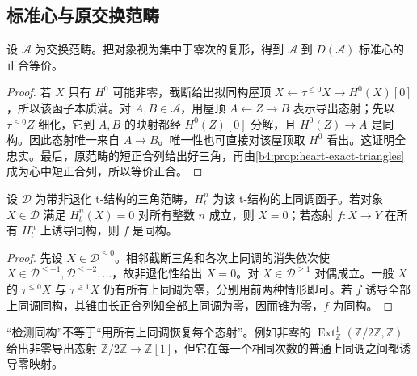 \subsection{标准心与原交换范畴}
\label{b4:subsec:1903:03}

\begin{proposition}\label{b4:prop:standard-heart-equivalence}
	设 \(\mathcal A\) 为交换范畴。把对象视为集中于零次的复形，得到 \(\mathcal A\) 到 \(D(\mathcal A)\) 标准心的正合等价。
\end{proposition}
\begin{proof}
	若 \(X\) 只有 \(H^0\) 可能非零，截断给出拟同构屋顶 \(X\leftarrow\tau^{\le0}X\to H^0(X)[0]\)，所以该函子本质满。对 \(A,B\in\mathcal A\)，用屋顶 \(A\leftarrow Z\to B\) 表示导出态射；先以 \(\tau^{\le0}Z\) 细化，它到 \(A,B\) 的映射都经 \(H^0(Z)[0]\) 分解，且 \(H^0(Z)\to A\) 是同构。因此态射唯一来自 \(A\to B\)。唯一性也可直接对该屋顶取 \(H^0\) 看出。这证明全忠实。最后，原范畴的短正合列给出好三角，再由\cref{b4:prop:heart-exact-triangles}成为心中短正合列，所以等价正合。
\end{proof}

\begin{proposition}\label{b4:prop:nondegenerate-cohomology-conservative}
	设 \(\mathcal D\) 为带非退化 t-结构的三角范畴，\(H_t^n\) 为该 t-结构的上同调函子。若对象 \(X\in\mathcal D\) 满足 \(H_t^n(X)=0\) 对所有整数 \(n\) 成立，则 \(X=0\)；若态射 \(f:X\to Y\) 在所有 \(H_t^n\) 上诱导同构，则 \(f\) 是同构。
\end{proposition}
\begin{proof}
	先设 \(X\in\mathcal D^{\le0}\)。相邻截断三角和各次上同调的消失依次使 \(X\in\mathcal D^{\le-1},\mathcal D^{\le-2},\ldots\)，故非退化性给出 \(X=0\)。对 \(X\in\mathcal D^{\ge1}\) 对偶成立。一般 \(X\) 的 \(\tau^{\le0}X\) 与 \(\tau^{\ge1}X\) 仍有所有上同调为零，分别用前两种情形即可。若 \(f\) 诱导全部上同调同构，其锥由长正合列知全部上同调为零，因而锥为零，\(f\) 为同构。
\end{proof}

“检测同构”不等于“用所有上同调恢复每个态射”。例如非零的 \(\operatorname{Ext}_{\mathbb Z}^1(\mathbb Z/2\mathbb Z,\mathbb Z)\) 给出非零导出态射 \(\mathbb Z/2\mathbb Z\to\mathbb Z[1]\)，但它在每一个相同次数的普通上同调之间都诱导零映射。

